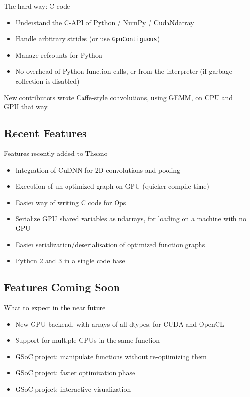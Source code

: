 \documentclass[a4paper,9pt]{beamer}
\begin{document}
\begin{frame}[fragile]{The hard way: C code}
  \begin{itemize}
    \item Understand the C-API of Python / NumPy / CudaNdarray
    \item Handle arbitrary strides (or use \verb|GpuContiguous|)
    \item Manage refcounts for Python
    \item No overhead of Python function calls, or from the interpreter (if garbage
      collection is disabled)
  \end{itemize}
  New contributors wrote Caffe-style convolutions, using GEMM, on CPU and GPU that way.
\end{frame}

\subsection{Recent Features}
\begin{frame}{Features recently added to Theano}
  \begin{itemize}
    \item Integration of CuDNN for 2D convolutions and pooling
    \item Execution of un-optimized graph on GPU (quicker compile time)
    \item Easier way of writing C code for Ops
    \item Serialize GPU shared variables as ndarrays, for loading on a machine with no GPU
    \item Easier serialization/deserialization of optimized function graphs
    \item Python 2 and 3 in a single code base
  \end{itemize}
\end{frame}

\subsection{Features Coming Soon}
\begin{frame}{What to expect in the near future}
  \begin{itemize}
    \item New GPU backend, with arrays of all dtypes, for CUDA and OpenCL
    \item Support for multiple GPUs in the same function
    \item GSoC project: manipulate functions without re-optimizing them
    \item GSoC project: faster optimization phase
    \item GSoC project: interactive visualization
  \end{itemize}
\end{frame}
\end{document}
